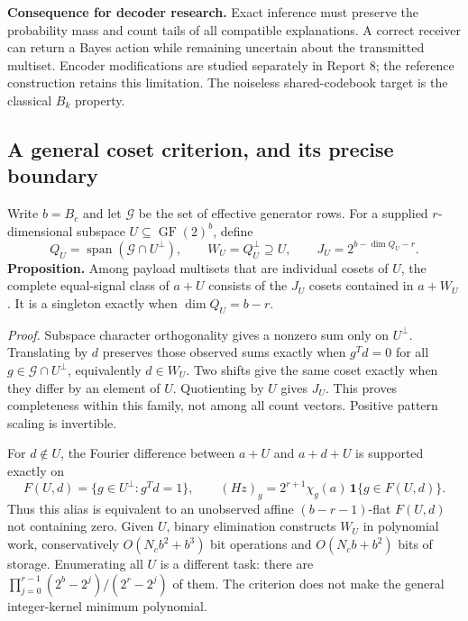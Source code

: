 \documentclass[10pt,a4paper]{article}
\newcommand{\GF}{\operatorname{GF}}
\newcommand{\ind}{\mathbf 1}
\begin{document}
\textbf{Consequence for decoder research.} Exact inference must preserve the probability mass and count tails of
all compatible explanations. A correct receiver can return a Bayes action while remaining uncertain about the
transmitted multiset. Encoder modifications are studied separately in Report 8; the reference construction
retains this limitation. The noiseless shared-codebook target is the classical $B_k$ property\cite{gu}.

\subsection{A general coset criterion, and its precise boundary}
\label{sec:coset-classification}
Write $b=B_c$ and let $\mathcal G$ be the set of effective generator rows. For a supplied
$r$-dimensional subspace $U\subseteq\GF(2)^b$, define
\begin{equation}
 Q_U=\operatorname{span}(\mathcal G\cap U^\perp),\qquad
 W_U=Q_U^\perp\supseteq U,\qquad J_U=2^{b-\dim Q_U-r}.
 \label{eq:coset-nullspace}
\end{equation}
\textbf{Proposition.} Among payload multisets that are individual cosets of $U$, the complete
equal-signal class of $a+U$ consists of the $J_U$ cosets contained in $a+W_U$.
It is a singleton exactly when $\dim Q_U=b-r$.

\textit{Proof.} Subspace character orthogonality gives a nonzero sum only on $U^\perp$.
Translating by $d$ preserves those observed sums exactly when $g^Td=0$ for all
$g\in\mathcal G\cap U^\perp$, equivalently $d\in W_U$. Two shifts give the same coset
exactly when they differ by an element of $U$. Quotienting by $U$ gives $J_U$. This proves
completeness within this family, not among all count vectors. Positive pattern scaling is invertible.

For $d\notin U$, the Fourier difference between $a+U$ and $a+d+U$ is supported exactly on
\begin{equation}
 F(U,d)=\{g\in U^\perp:g^Td=1\},\qquad
 (H z)_g=2^{r+1}\chi_g(a)\,\ind\{g\in F(U,d)\}.
 \label{eq:coset-fourier-support}
\end{equation}
Thus this alias is equivalent to an unobserved affine $(b-r-1)$-flat $F(U,d)$ not containing zero.
Given $U$, binary elimination constructs $W_U$ in polynomial work, conservatively
$O(N_cb^2+b^3)$ bit operations and $O(N_cb+b^2)$ bits of storage. Enumerating all $U$ is a
different task: there are $\prod_{j=0}^{r-1}(2^b-2^j)/(2^r-2^j)$ of them.
The criterion does not make the general integer-kernel minimum polynomial.
\end{document}
